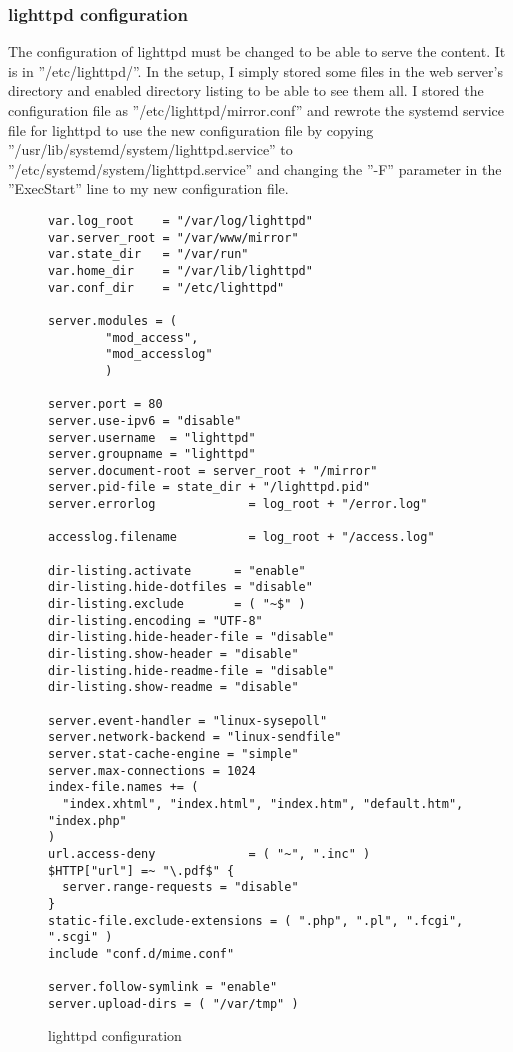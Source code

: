 \subsubsection{lighttpd configuration}
The configuration of lighttpd must be changed to be able to serve the content.
It is in ''/etc/lighttpd/''. In the setup, I simply stored some files in the web
server's directory and enabled directory listing to be able to see them all.
I stored the configuration file as ''/etc/lighttpd/mirror.conf'' and rewrote
the systemd service file for lighttpd to use the new configuration file by
copying ''/usr/lib/systemd/system/lighttpd.service'' to ''/etc/systemd/system/lighttpd.service''
and changing the ''-F'' parameter in the ''ExecStart'' line to my new configuration file.
\begin{figure}
\begin{lstlisting}
var.log_root    = "/var/log/lighttpd"
var.server_root = "/var/www/mirror"
var.state_dir   = "/var/run"
var.home_dir    = "/var/lib/lighttpd"
var.conf_dir    = "/etc/lighttpd"

server.modules = (
        "mod_access",
        "mod_accesslog"
        )

server.port = 80
server.use-ipv6 = "disable"
server.username  = "lighttpd"
server.groupname = "lighttpd"
server.document-root = server_root + "/mirror"
server.pid-file = state_dir + "/lighttpd.pid"
server.errorlog             = log_root + "/error.log"

accesslog.filename          = log_root + "/access.log"

dir-listing.activate      = "enable"
dir-listing.hide-dotfiles = "disable"
dir-listing.exclude       = ( "~$" )
dir-listing.encoding = "UTF-8"
dir-listing.hide-header-file = "disable"
dir-listing.show-header = "disable"
dir-listing.hide-readme-file = "disable"
dir-listing.show-readme = "disable"

server.event-handler = "linux-sysepoll"
server.network-backend = "linux-sendfile"
server.stat-cache-engine = "simple"
server.max-connections = 1024
index-file.names += (
  "index.xhtml", "index.html", "index.htm", "default.htm", "index.php"
)
url.access-deny             = ( "~", ".inc" )
$HTTP["url"] =~ "\.pdf$" {
  server.range-requests = "disable"
}
static-file.exclude-extensions = ( ".php", ".pl", ".fcgi", ".scgi" )
include "conf.d/mime.conf"

server.follow-symlink = "enable"
server.upload-dirs = ( "/var/tmp" )
\end{lstlisting}
\caption{lighttpd configuration}
\end{figure}
